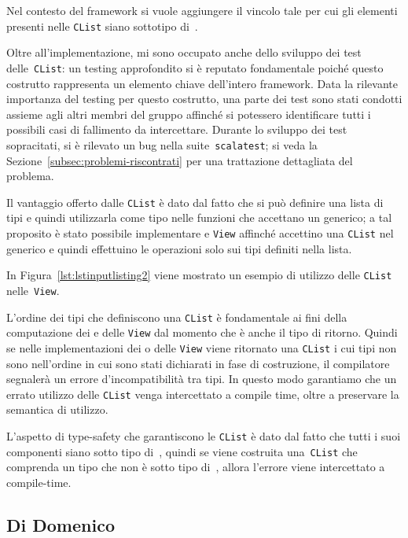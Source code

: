 Nel contesto del framework si vuole aggiungere il vincolo tale per cui gli elementi presenti nelle \texttt{CList} siano
sottotipo di~\Component.

Oltre all'implementazione, mi sono occupato anche dello sviluppo dei test delle~\texttt{CList}: un testing approfondito
si è reputato fondamentale poiché questo costrutto rappresenta un elemento chiave dell'intero framework.
Data la rilevante importanza del testing per questo costrutto, una parte dei test sono stati condotti assieme agli altri
membri del gruppo affinché si potessero identificare tutti i possibili casi di fallimento da intercettare.
Durante lo sviluppo dei test sopracitati, si è rilevato un bug nella suite~\texttt{scalatest}; si veda la
Sezione~\ref{subsec:problemi-riscontrati} per una trattazione dettagliata del problema.

Il vantaggio offerto dalle \texttt{CList} è dato dal fatto che si può definire una lista di tipi e quindi utilizzarla
come tipo nelle funzioni che accettano un generico;
a tal proposito è stato possibile implementare \System e \texttt{View} affinché accettino una \texttt{CList} nel generico
e quindi effettuino le operazioni solo sui tipi definiti nella lista.

In Figura~\ref{lst:lstinputlisting2} viene mostrato un esempio di utilizzo delle \texttt{CList} nelle~\texttt{View}.


L'ordine dei tipi che definiscono una \texttt{CList} è fondamentale ai fini della computazione dei \System e delle
\texttt{View} dal momento che è anche il tipo di ritorno.
Quindi se nelle implementazioni dei \System o delle \texttt{View} viene ritornato una \texttt{CList} i cui tipi non sono
nell'ordine in cui sono stati dichiarati in fase di costruzione, il compilatore segnalerà un errore d'incompatibilità
tra tipi.
In questo modo garantiamo che un errato utilizzo delle \texttt{CList} venga intercettato a compile time, oltre a
preservare la semantica di utilizzo.

L'aspetto di type-safety che garantiscono le \texttt{CList} è dato dal fatto che tutti i suoi componenti siano sotto tipo
di~\Component, quindi se viene costruita una~\texttt{CList} che comprenda un tipo che non è sotto tipo di~\Component,
allora l'errore viene intercettato a compile-time.

\subsection{Di Domenico}\label{subsec:nicolò-di-domenico}

